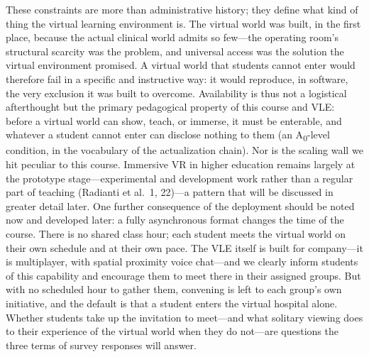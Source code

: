 These constraints are more than administrative history; they define what kind of
thing the virtual learning environment is. The virtual world was built, in the
first place, because the actual clinical world admits so few---the operating
room's structural scarcity was the problem, and universal access was the
solution the virtual environment promised. A virtual world that students cannot
enter would therefore fail in a specific and instructive way: it would
reproduce, in software, the very exclusion it was built to overcome.
Availability is thus not a logistical afterthought but the primary pedagogical
property of this course and VLE: before a virtual world can show,
teach, or immerse, it must be enterable, and whatever a student cannot enter can
disclose nothing to them (an A\textsubscript{0}-level condition, in the
vocabulary of the actualization chain). Nor is the scaling wall we hit peculiar
to this course. Immersive VR in higher education remains largely at the
prototype stage---experimental and development work rather than a regular part
of teaching (Radianti et al.\ 1, 22)---a pattern that will be discussed in
greater detail later. One further consequence of the deployment should be noted
now and developed later: a fully asynchronous format changes the time of the
course. There is no shared class hour; each student meets the virtual world on
their own schedule and at their own pace. The VLE itself is built for
company---it is multiplayer, with spatial proximity voice chat---and we clearly
inform students of this capability and encourage them to meet there in their
assigned groups. But with no scheduled hour to gather them, convening is left to
each group's own initiative, and the default is that a student enters the
virtual hospital alone. Whether students take up the invitation to meet---and
what solitary viewing does to their experience of the virtual world when they do
not---are questions the three terms of survey responses will answer.


